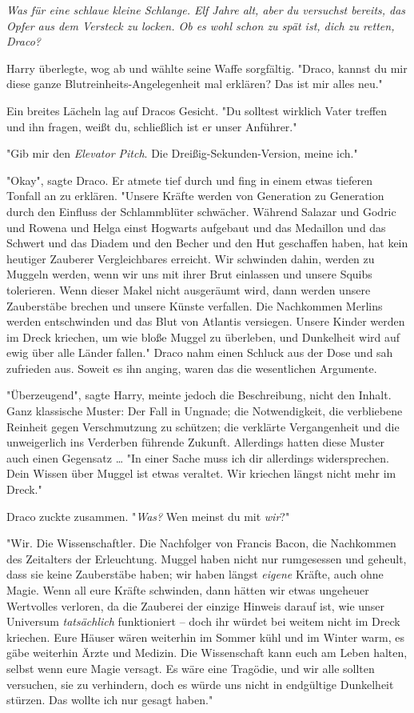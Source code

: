 {\emph{Was für eine schlaue kleine Schlange. Elf Jahre alt, aber du versuchst bereits, das Opfer aus dem Versteck zu locken. Ob es wohl schon zu spät ist, dich zu retten, Draco?}

Harry überlegte, wog ab und wählte seine Waffe sorgfältig. "Draco, kannst du mir diese ganze Blutreinheits-Angelegenheit mal erklären? Das ist mir alles neu."

Ein breites Lächeln lag auf Dracos Gesicht. "Du solltest wirklich Vater treffen und ihn fragen, weißt du, schließlich ist er unser Anführer."

"Gib mir den \emph{Elevator Pitch}. Die Dreißig-Sekunden-Version, meine ich."

"Okay", sagte Draco. Er atmete tief durch und fing in einem etwas tieferen Tonfall an zu erklären. "Unsere Kräfte werden von Generation zu Generation durch den Einfluss der Schlammblüter schwächer. Während Salazar und Godric und Rowena und Helga einst Hogwarts aufgebaut und das Medaillon und das Schwert und das Diadem und den Becher und den Hut geschaffen haben, hat kein heutiger Zauberer Vergleichbares erreicht. Wir schwinden dahin, werden zu Muggeln werden, wenn wir uns mit ihrer Brut einlassen und unsere Squibs tolerieren. Wenn dieser Makel nicht ausgeräumt wird, dann werden unsere Zauberstäbe brechen und unsere Künste verfallen. Die Nachkommen Merlins werden entschwinden und das Blut von Atlantis versiegen. Unsere Kinder werden im Dreck kriechen, um wie bloße Muggel zu überleben, und Dunkelheit wird auf ewig über alle Länder fallen." Draco nahm einen Schluck aus der Dose und sah zufrieden aus. Soweit es ihn anging, waren das die wesentlichen Argumente.

"Überzeugend", sagte Harry, meinte jedoch die Beschreibung, nicht den Inhalt. Ganz klassische Muster: Der Fall in Ungnade; die Notwendigkeit, die verbliebene Reinheit gegen Verschmutzung zu schützen; die verklärte Vergangenheit und die unweigerlich ins Verderben führende Zukunft. Allerdings hatten diese Muster auch einen Gegensatz … "In einer Sache muss ich dir allerdings widersprechen. Dein Wissen über Muggel ist etwas veraltet. Wir kriechen längst nicht mehr im Dreck."

Draco zuckte zusammen. "\emph{Was?} Wen meinst du mit \emph{wir}?"

"Wir. Die Wissenschaftler. Die Nachfolger von Francis Bacon, die Nachkommen des Zeitalters der Erleuchtung. Muggel haben nicht nur rumgesessen und geheult, dass sie keine Zauberstäbe haben; wir haben längst \emph{eigene} Kräfte, auch ohne Magie. Wenn all eure Kräfte schwinden, dann hätten wir etwas ungeheuer Wertvolles verloren, da die Zauberei der einzige Hinweis darauf ist, wie unser Universum \emph{tatsächlich} funktioniert -- doch ihr würdet bei weitem nicht im Dreck kriechen. Eure Häuser wären weiterhin im Sommer kühl und im Winter warm, es gäbe weiterhin Ärzte und Medizin. Die Wissenschaft kann euch am Leben halten, selbst wenn eure Magie versagt. Es wäre eine Tragödie, und wir alle sollten versuchen, sie zu verhindern, doch es würde uns nicht in endgültige Dunkelheit stürzen. Das wollte ich nur gesagt haben."

}
